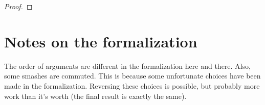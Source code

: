 \documentclass{article}
\begin{document}
\begin{proof}
\end{proof}


\section{Notes on the formalization}

The order of arguments are different in the formalization here and there.
Also, some smashes are commuted. This is because some unfortunate choices have been made in the formalization. Reversing these choices is possible, but probably more work than it's worth (the final result is exactly the same).
\end{document}
